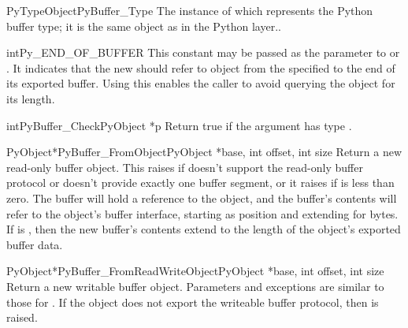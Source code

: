\begin{cvardesc}{PyTypeObject}{PyBuffer_Type}
  The instance of  which represents the Python
  buffer type; it is the same object as  in the
  Python layer..
\end{cvardesc}

\begin{cvardesc}{int}{Py_END_OF_BUFFER}
  This constant may be passed as the  parameter to
   or
  .  It indicates that the
  new  should refer to  object from
  the specified  to the end of its exported buffer.  Using
  this enables the caller to avoid querying the  object for
  its length.
\end{cvardesc}

\begin{cfuncdesc}{int}{PyBuffer_Check}{PyObject *p}
  Return true if the argument has type .
\end{cfuncdesc}

\begin{cfuncdesc}{PyObject*}{PyBuffer_FromObject}{PyObject *base,
                                                  int offset, int size}
  Return a new read-only buffer object.  This raises
   if  doesn't support the read-only
  buffer protocol or doesn't provide exactly one buffer segment, or it
  raises  if  is less than zero. The
  buffer will hold a reference to the  object, and the
  buffer's contents will refer to the  object's buffer
  interface, starting as position  and extending for
   bytes. If  is , then
  the new buffer's contents extend to the length of the 
  object's exported buffer data.
\end{cfuncdesc}

\begin{cfuncdesc}{PyObject*}{PyBuffer_FromReadWriteObject}{PyObject *base,
                                                           int offset,
                                                           int size}
  Return a new writable buffer object.  Parameters and exceptions are
  similar to those for .  If the
   object does not export the writeable buffer protocol,
  then  is raised.
\end{cfuncdesc}

